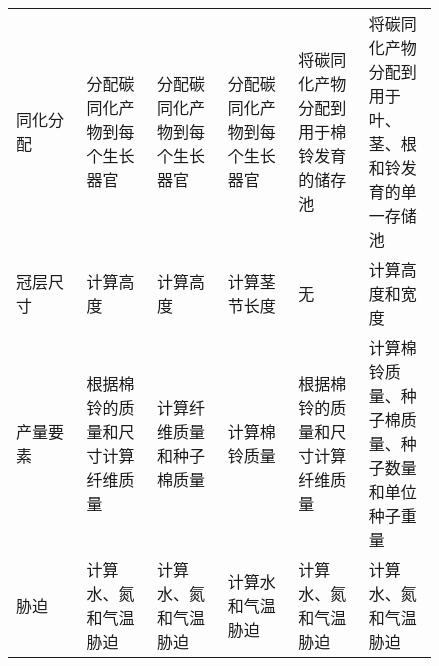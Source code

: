 \begin{table}
\begin{tabular}{p{0.14\linewidth}p{0.14\linewidth}p{0.14\linewidth}p{0.14\linewidth}p{0.14\linewidth}p{0.14\linewidth}}
        同化分配   & 分配碳同化产物到每个生长器官                                                 & 分配碳同化产物到每个生长器官                                                 & 分配碳同化产物到每个生长器官                                             & 将碳同化产物分配到用于棉铃发育的储存池                                     & 将碳同化产物分配到用于叶、茎、根和铃发育的单一存储池                                             \\
        冠层尺寸   & 计算高度                                                                     & 计算高度                                                                     & 计算茎节长度                                                             & 无                                                                         & 计算高度和宽度                                                                                   \\
        产量要素   & 根据棉铃的质量和尺寸计算纤维质量                                             & 计算纤维质量和种子棉质量                                                     & 计算棉铃质量                                                             & 根据棉铃的质量和尺寸计算纤维质量                                           & 计算棉铃质量、种子棉质量、种子数量和单位种子重量                                                 \\
        胁迫       & 计算水、氮和气温胁迫                                                         & 计算水、氮和气温胁迫                                                         & 计算水和气温胁迫                                                         & 计算水、氮和气温胁迫                                                       & 计算水、氮和气温胁迫                                                                             \\
        \bottomrule
    \end{tabular}
\end{table}

